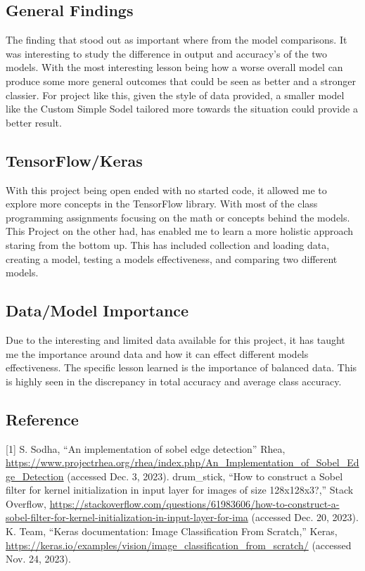 \documentclass[11pt,a4paper]{article}
\begin{document}
\subsection*{General Findings}

The finding that stood out as important where from the model comparisons. It was interesting to study the difference in output and accuracy's of the two models. With the most interesting lesson being how a worse overall model can produce some more general outcomes that could be seen as better and a stronger classier. For project like this, given the style of data provided, a smaller model like the Custom Simple Sodel tailored more towards the situation could provide a better result.

\subsection*{TensorFlow/Keras}

With this project being open ended with no started code, it allowed me to explore more concepts in the TensorFlow library. With most of the class programming assignments focusing on the math or concepts behind the models. This Project on the other had, has enabled me to learn a more holistic approach staring from the bottom up. This has included collection and loading data, creating a model, testing a models effectiveness, and comparing two different models.


\subsection*{Data/Model Importance}

Due to the interesting and limited data available for this project, it has taught me the importance around data and how it can effect different models effectiveness. The specific lesson learned is the importance of balanced data. This is highly seen in the discrepancy in total accuracy and average class accuracy.

\subsection*{Reference}
[1] S. Sodha, “An implementation of sobel edge detection” Rhea, \url{https://www.projectrhea.org/rhea/index.php/An_Implementation_of_Sobel_Edge_Detection} (accessed Dec. 3, 2023). \newline
[2] drum\_stick, “How to construct a Sobel filter for kernel initialization in input layer for images of size 128x128x3?,” Stack Overflow, \url{https://stackoverflow.com/questions/61983606/how-to-construct-a-sobel-filter-for-kernel-initialization-in-input-layer-for-ima} (accessed Dec. 20, 2023). \newline
[3] K. Team, “Keras documentation: Image Classification From Scratch,” Keras, \url{https://keras.io/examples/vision/image_classification_from_scratch/} (accessed Nov. 24, 2023). 
\end{document}
